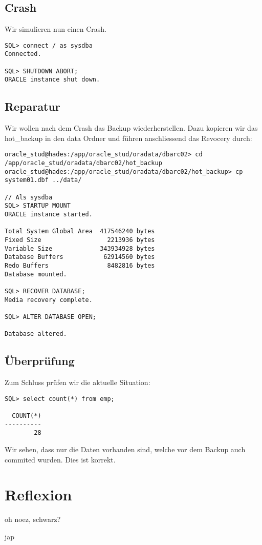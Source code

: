 \documentclass[11pt,a4paper,parskip=half]{scrartcl}
\begin{document}
\subsection{Crash}
Wir simulieren nun einen Crash.

\begin{lstlisting}
SQL> connect / as sysdba
Connected.

SQL> SHUTDOWN ABORT;
ORACLE instance shut down.
\end{lstlisting}

\subsection{Reparatur}
Wir wollen nach dem Crash das Backup wiederherstellen. Dazu kopieren wir das hot\_backup in den data Ordner und führen anschliessend das Revocery durch:
\begin{lstlisting}
oracle_stud@hades:/app/oracle_stud/oradata/dbarc02> cd /app/oracle_stud/oradata/dbarc02/hot_backup
oracle_stud@hades:/app/oracle_stud/oradata/dbarc02/hot_backup> cp system01.dbf ../data/

// Als sysdba
SQL> STARTUP MOUNT
ORACLE instance started.

Total System Global Area  417546240 bytes
Fixed Size                  2213936 bytes
Variable Size             343934928 bytes
Database Buffers           62914560 bytes
Redo Buffers                8482816 bytes
Database mounted.

SQL> RECOVER DATABASE;
Media recovery complete.

SQL> ALTER DATABASE OPEN;

Database altered.
\end{lstlisting}
\subsection{Überprüfung}
Zum Schluss prüfen wir die aktuelle Situation:

\begin{lstlisting}
SQL> select count(*) from emp;

  COUNT(*)
----------
        28
\end{lstlisting}

Wir sehen, dass nur die Daten vorhanden sind, welche vor dem Backup auch commited wurden. Dies ist korrekt.

\newpage
\section{Reflexion}
oh noez, schwarz?

jap
\end{document}
